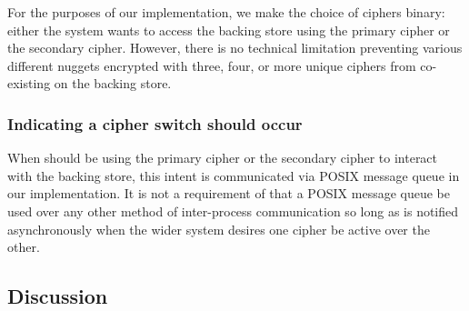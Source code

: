 For the purposes of our implementation, we make the choice of ciphers binary:
either the system wants \SYSTEM{} to access the backing store using the primary
cipher or the secondary cipher. However, there is no technical limitation
preventing various different nuggets encrypted with three, four, or more unique
ciphers from co-existing on the backing store.

\subsubsection{Indicating a cipher switch should occur}

When \SYSTEM{} should be using the primary cipher or the secondary cipher to
interact with the backing store, this intent is communicated via POSIX message
queue in our implementation. It is not a requirement of \SYSTEM{} that a POSIX
message queue be used over any other method of inter-process communication so
long as \SYSTEM{} is notified asynchronously when the wider system desires one
cipher be active over the other.

\subsection{Discussion}



